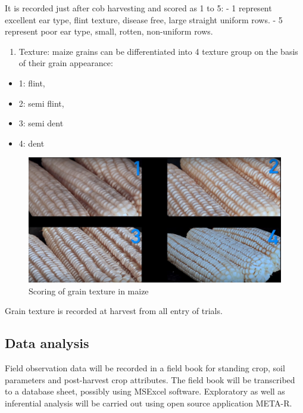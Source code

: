 \documentclass[
]{article}
\providecommand{\tightlist}{%
  \setlength{\itemsep}{0pt}\setlength{\parskip}{0pt}}
\begin{document}
It is recorded just after cob harvesting and scored as 1 to 5:
- 1 represent excellent ear type, flint texture, disease free, large straight uniform rows.
- 5 represent poor ear type, small, rotten, non-uniform rows.

\begin{enumerate}
\def\labelenumi{\arabic{enumi}.}
\setcounter{enumi}{15}
\tightlist
\item
  Texture: maize grains can be differentiated into 4 texture group on the basis of their grain appearance:
\end{enumerate}

\begin{itemize}
\tightlist
\item
  1: flint,
\item
  2: semi flint,
\item
  3: semi dent
\item
  4: dent
\end{itemize}

\begin{figure}

{\centering \includegraphics[width=0.6\linewidth]{./images/maize_texture} 

}

\caption{Scoring of grain texture in maize}\label{fig:maize-texture}
\end{figure}

Grain texture is recorded at harvest from all entry of trials.

\hypertarget{data-analysis}{%
\subsection{Data analysis}\label{data-analysis}}

Field observation data will be recorded in a field book for standing crop, soil parameters and post-harvest crop attributes. The field book will be transcribed to a database sheet, possibly using MSExcel software. Exploratory as well as inferential analysis will be carried out using open source application META-R.
\end{document}
